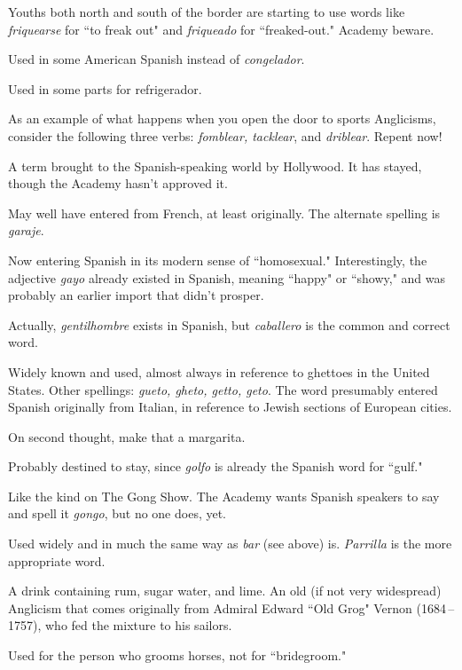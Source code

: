  Youths both north and south of the border are starting to use words like \emph{friquearse} for ``to freak out" and \emph{friqueado} for
``freaked-out." Academy beware.

 Used in some American Spanish instead of
\emph{congelador}.

 Used in some parts for refrigerador.

 As an example of what happens when you open the
door to sports Anglicisms, consider the following three verbs: \emph{fomblear, tacklear}, and \emph{driblear}. Repent now!

 A term brought to the Spanish-speaking world by
Hollywood. It has stayed, though the Academy hasn't approved it.

 May well have entered from French, at least originally. The alternate spelling is \emph{garaje}.

 Now entering Spanish in its modern sense of ``homosexual." Interestingly, the adjective \emph{gayo} already existed in Spanish,
meaning ``happy" or ``showy," and was probably an earlier import that
didn't prosper.

 Actually, \emph{gentilhombre} exists in Spanish, but
\emph{caballero} is the common and correct word.

 Widely known and used, almost always in reference
to ghettoes in the United States. Other spellings: \emph{gueto, gheto, getto,
geto}. The word presumably entered Spanish originally from Italian, in
reference to Jewish sections of European cities.

 On second thought, make that a margarita.

 Probably destined to stay, since \emph{golfo} is already the
Spanish word for ``gulf."

 Like the kind on The Gong Show. The Academy
wants Spanish speakers to say and spell it \emph{gongo}, but no one does, yet.

 Used widely and in much the same way as \emph{bar} (see
above) is. \emph{Parrilla} is the more appropriate word.

 A drink containing rum, sugar water, and lime. An old
(if not very widespread) Anglicism that comes originally from Admiral
Edward ``Old Grog" Vernon (1684\,--1757), who fed the mixture to his
sailors.

 Used for the person who grooms horses, not for
``bridegroom."

